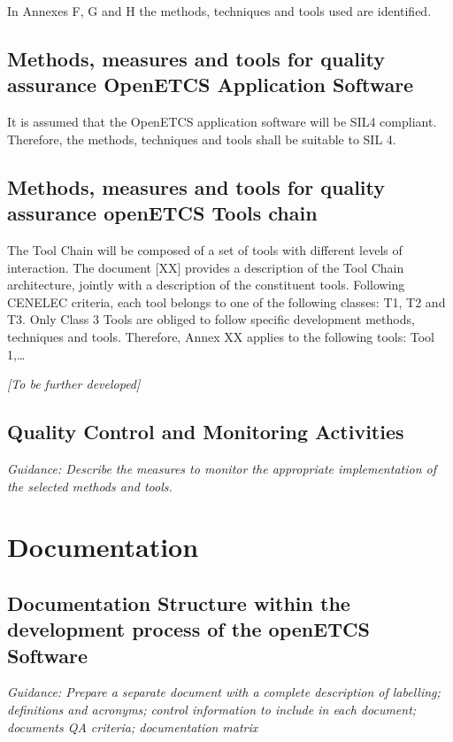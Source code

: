 \documentclass{template/openetcs_article}
\begin{document}
In Annexes F, G and H the methods, techniques and tools used are identified.


\subsection{Methods, measures and tools for quality assurance OpenETCS Application Software}

It is assumed that the OpenETCS application software will be SIL4 compliant. Therefore, the methods, techniques and tools shall be suitable to SIL 4. 

\subsection{Methods, measures and tools for quality assurance openETCS Tools chain}

The Tool Chain will be composed of a set of tools with different levels of interaction. The document [XX] provides a description of the Tool Chain architecture, jointly with a description of the constituent tools.
Following CENELEC criteria, each tool belongs to one of the following classes: T1, T2 and T3. Only Class 3 Tools are obliged to follow specific development methods, techniques and tools. Therefore, Annex XX applies to the following tools: Tool 1,{\dots}

\textit{[To be further developed]}

\subsection{Quality Control and Monitoring Activities}
\textit{Guidance: Describe the measures to monitor the appropriate implementation of the selected methods and tools.}



\section{Documentation}

\subsection{Documentation Structure within the development process of the openETCS Software}
\textit{Guidance: Prepare a separate document with a complete description of labelling; definitions and acronyms; control information to include in each document; documents QA criteria; documentation matrix}
\end{document}
